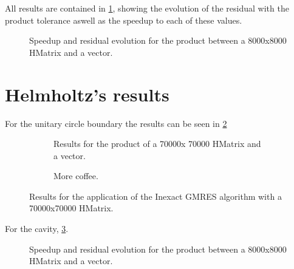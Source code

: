 All results are contained in \ref{fig:laplace_results}, showing the evolution of the residual with the product tolerance aswell as the speedup to each of these values.

\begin{figure}[h!]
    \centering
    
    \caption{Speedup and residual evolution for the product between a 8000x8000 HMatrix and a vector.}
    \label{fig:laplace_results}
\end{figure}

\section{Helmholtz's results}

For the unitary circle boundary the results can be seen in \ref{fig:Helmholtz_circle_results}


\begin{figure}[h!]
    \centering
    \begin{subfigure}[b]{0.4\linewidth}
        
        \caption{Results for the product of a 70000x 70000 HMatrix and a vector.}
    \end{subfigure}
    \begin{subfigure}[b]{0.4\linewidth}
        
        \caption{More coffee.}
    \end{subfigure}
    \caption{Results for the application of the Inexact GMRES algorithm with a 70000x70000 HMatrix.}
    \label{fig:Helmholtz_circle_results}
\end{figure}


For the cavity, \ref{fig:cavity_results}.

\begin{figure}[h!]
    \centering
    
    \caption{Speedup and residual evolution for the product between a 8000x8000 HMatrix and a vector.}
    \label{fig:cavity_results}
\end{figure}
